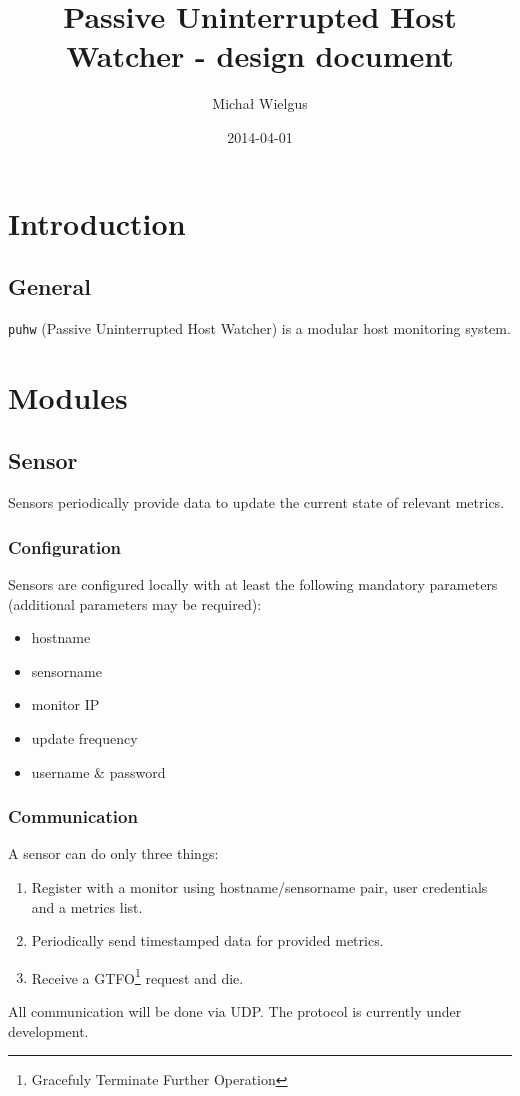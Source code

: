 \documentclass[a4paper]{article}
\author{Michał Wielgus}
\title{Passive Uninterrupted Host Watcher - design document}
\date{2014-04-01}
\begin{document}
\maketitle
\tableofcontents
\listoffigures
\clearpage
\setcounter{page}{1} 
\section{Introduction}
\subsection{General}
\texttt{puhw} (Passive Uninterrupted Host Watcher) is a modular host monitoring system.
\section{Modules}
\subsection{Sensor}
Sensors periodically provide data to update the current state of relevant metrics.
\subsubsection{Configuration}
Sensors are configured locally with at least the following mandatory parameters (additional parameters may be required):
\begin{itemize}
	\item hostname
	\item sensorname
	\item monitor IP
	\item update frequency
	\item username \& password
\end{itemize}
\subsubsection{Communication}
A sensor can do only three things:
\begin{enumerate}
	\item Register with a monitor using hostname/sensorname pair, user credentials and a metrics list.
	\item Periodically send timestamped data for provided metrics.
	\item Receive a GTFO\footnote{Gracefuly Terminate Further Operation} request and die.
\end{enumerate}
All communication will be done via UDP.
The protocol is currently under development.
\end{document}
